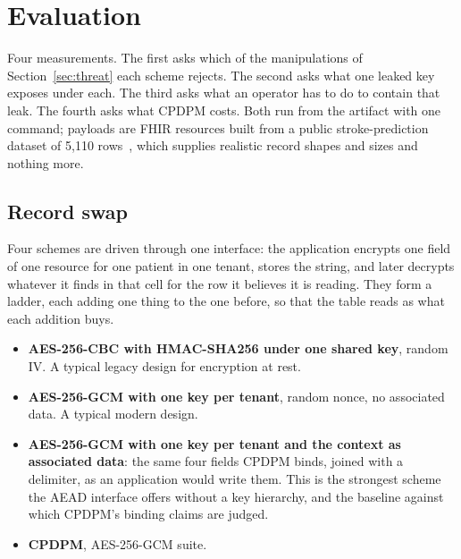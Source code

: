 \section{Evaluation}
\label{sec:evaluation}


Four measurements. The first asks which of the manipulations of Section~\ref{sec:threat} each scheme rejects. The second asks what one leaked key exposes under each. The third asks what an operator has to do to contain that leak. The fourth asks what CPDPM costs. Both run from the artifact with one command; payloads are FHIR  resources built from a public stroke-prediction dataset of 5{,}110 rows~\cite{kaggle-stroke}, which supplies realistic record shapes and sizes and nothing more.

\subsection{Record swap}
\label{sec:swap}

Four schemes are driven through one interface: the application encrypts one field of one resource for one patient in one tenant, stores the string, and later decrypts whatever it finds in that cell for the row it believes it is reading. They form a ladder, each adding one thing to the one before, so that the table reads as what each addition buys.

\begin{itemize}
  \item \textbf{AES-256-CBC with HMAC-SHA256 under one shared key}, random IV. A typical legacy design for encryption at rest.
  \item \textbf{AES-256-GCM with one key per tenant}, random nonce, no associated data. A typical modern design.
  \item \textbf{AES-256-GCM with one key per tenant and the context as associated data}: the same four fields CPDPM binds, joined with a delimiter, as an application would write them. This is the strongest scheme the AEAD interface offers without a key hierarchy, and the baseline against which CPDPM's binding claims are judged.
  \item \textbf{CPDPM}, AES-256-GCM suite.
\end{itemize}

